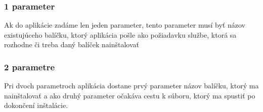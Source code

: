 \subsubsection{1 parameter}
Ak do aplikácie zadáme len jeden parameter, tento parameter musí byť názov existujúceho balíčku, ktorý aplikácia pošle ako požiadavku službe, ktorá sa rozhodne či treba daný balíček nainštalovať

\subsubsection{2 parametre}
Pri dvoch parametroch aplikácia dostane prvý parameter názov balíčku, ktorý ma nainštalovať a ako druhý parameter očakáva cestu k súboru, ktorý ma spustiť po dokončení inštalácie.


